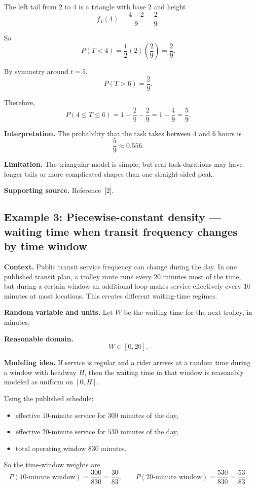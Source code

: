 \documentclass[11pt]{article}
\begin{document}
	The left tail from $2$ to $4$ is a triangle with base $2$ and height
	\[
	f_T(4)=\frac{4-2}{9}=\frac29.
	\]
	
	So
	\[
	P(T<4)=\frac12(2)\left(\frac29\right)=\frac29.
	\]
	
	By symmetry around $t=5$,
	\[
	P(T>6)=\frac29.
	\]
	
	Therefore,
	\[
	P(4\le T\le 6)=1-\frac29-\frac29
	=1-\frac49
	=\frac59.
	\]
	
	\textbf{Interpretation.} The probability that the task takes between $4$ and $6$ hours is
	\[
	\frac59\approx 0.556.
	\]
	
	\textbf{Limitation.} The triangular model is simple, but real task durations may have longer tails or more complicated shapes than one straight-sided peak.
	
	\textbf{Supporting source.} Reference \,[2].
	
	\subsection{Example 3: Piecewise-constant density --- waiting time when transit frequency changes by time window}
	
	\textbf{Context.} Public transit service frequency can change during the day. In one published transit plan, a trolley route runs every $20$ minutes most of the time, but during a certain window an additional loop makes service effectively every $10$ minutes at most locations. This creates different waiting-time regimes.
	
	\textbf{Random variable and units.} Let $W$ be the waiting time for the next trolley, in minutes.
	
	\textbf{Reasonable domain.}
	\[
	W\in[0,20].
	\]
	
	\textbf{Modeling idea.} If service is regular and a rider arrives at a random time during a window with headway $H$, then the waiting time in that window is reasonably modeled as uniform on $[0,H]$.
	
	Using the published schedule:
	\begin{itemize}[leftmargin=*]
		\item effective $10$-minute service for $300$ minutes of the day,
		\item effective $20$-minute service for $530$ minutes of the day,
		\item total operating window $830$ minutes.
	\end{itemize}
	
	So the time-window weights are
	\[
	P(\text{10-minute window})=\frac{300}{830}=\frac{30}{83},
	\qquad
	P(\text{20-minute window})=\frac{530}{830}=\frac{53}{83}.
	\]
	
\end{document}
